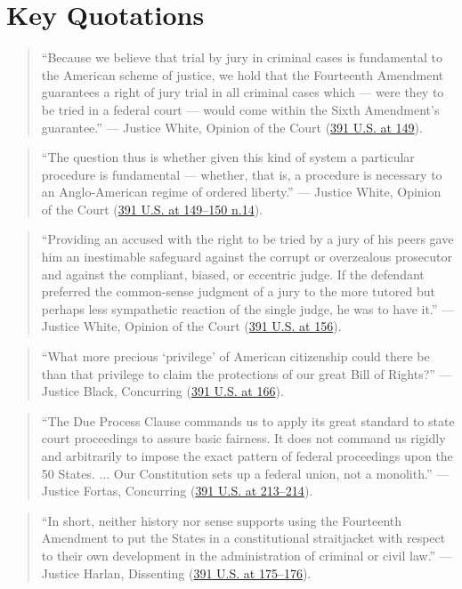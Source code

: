 \documentclass[12pt]{article}
\begin{document}
\section{Key Quotations}

\begin{quote}
``Because we believe that trial by jury in criminal cases is fundamental to the American scheme of justice, we hold that the Fourteenth Amendment guarantees a right of jury trial in all criminal cases which --- were they to be tried in a federal court --- would come within the Sixth Amendment's guarantee.''
--- Justice White, Opinion of the Court (\href{https://supreme.justia.com/cases/federal/us/391/145/}{391 U.S. at 149}).
\end{quote}

\begin{quote}
``The question thus is whether given this kind of system a particular procedure is fundamental --- whether, that is, a procedure is necessary to an Anglo-American regime of ordered liberty.''
--- Justice White, Opinion of the Court (\href{https://supreme.justia.com/cases/federal/us/391/145/}{391 U.S. at 149--150 n.14}).
\end{quote}

\begin{quote}
``Providing an accused with the right to be tried by a jury of his peers gave him an inestimable safeguard against the corrupt or overzealous prosecutor and against the compliant, biased, or eccentric judge. If the defendant preferred the common-sense judgment of a jury to the more tutored but perhaps less sympathetic reaction of the single judge, he was to have it.''
--- Justice White, Opinion of the Court (\href{https://caselaw.findlaw.com/court/us-supreme-court/391/145.html}{391 U.S. at 156}).
\end{quote}

\begin{quote}
``What more precious `privilege' of American citizenship could there be than that privilege to claim the protections of our great Bill of Rights?''
--- Justice Black, Concurring (\href{https://supreme.justia.com/cases/federal/us/391/145/}{391 U.S. at 166}).
\end{quote}

\begin{quote}
``The Due Process Clause commands us to apply its great standard to state court proceedings to assure basic fairness. It does not command us rigidly and arbitrarily to impose the exact pattern of federal proceedings upon the 50 States. ... Our Constitution sets up a federal union, not a monolith.''
--- Justice Fortas, Concurring (\href{https://supreme.justia.com/cases/federal/us/391/194/}{391 U.S. at 213--214}).
\end{quote}

\begin{quote}
``In short, neither history nor sense supports using the Fourteenth Amendment to put the States in a constitutional straitjacket with respect to their own development in the administration of criminal or civil law.''
--- Justice Harlan, Dissenting (\href{https://supreme.justia.com/cases/federal/us/391/145/}{391 U.S. at 175--176}).
\end{quote}
\end{document}
